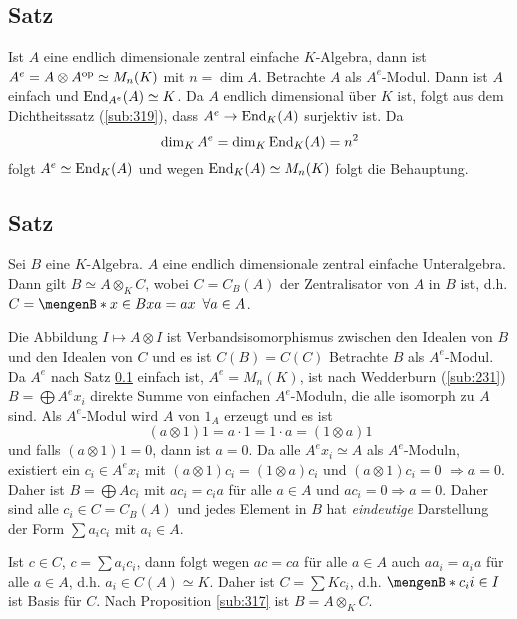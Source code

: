 \subsection[Satz: Modulisomorphie der einhüllenden Algebra zum Matrizenmodul]{Satz} %
\label{sub:321}
Ist $A$ eine endlich dimensionale zentral einfache $K$-Algebra, dann ist $A^e = A \otimes A^{\mathrm{op}} \simeq M_n(K)$ mit $n= \dim A$.
Betrachte $A$ als $A^e$-Modul. Dann ist $A$ einfach und $\operatorname{End}_{A^e} (A) \simeq K$. Da $A$ endlich dimensional über $K$ ist, folgt aus dem Dichtheitssatz (\ref{sub:319}),
dass $A^e \to \operatorname{End}_K(A)$ surjektiv ist. Da 
\[
	\dim_K A^e = \dim_K \operatorname{End}_K(A) = n^2
\]
folgt $A^e \simeq \operatorname{End}_K(A)$ und wegen $\operatorname{End}_K(A) \simeq M_n(K)$ folgt die Behauptung. \bewende

\subsection{Satz} %
\label{sub:322}
Sei $B$ eine $K$-Algebra. $A$ eine endlich dimensionale zentral einfache Unteralgebra. Dann gilt $B \simeq A \otimes_K C$, wobei $C= C_B(A)$ der Zentralisator von $A$ in 
$B$ ist, d.h. $C= \set[x \in B]{x a = a x \enspace \forall a \in A}$. 

Die Abbildung $I \mapsto A \otimes I$ ist Verbandsisomorphismus zwischen den Idealen von $B$ und 
den Idealen von $C$ und es ist $C(B)= C(C)$
Betrachte $B$ als $A^e$-Modul. Da $A^e$ nach Satz \ref{sub:321} einfach ist, $A^e = M_n(K)$, ist nach Wedderburn (\ref{sub:231}) 
\(
	B = \bigoplus A^e x_i
\)
direkte Summe von einfachen $A^e$-Moduln, die alle isomorph zu $A$ sind. Als $A^e$-Modul wird $A$ von $1_A$ erzeugt und es ist 
\[
	(a \otimes 1)1 = a \cdot 1 = 1 \cdot a = (1 \otimes a) 1
\]
und falls $(a \otimes 1)1 = 0$, dann ist $a=0$. Da alle $A^e x_i \simeq A$ als $A^e$-Moduln, existiert ein $c_i \in A^e x_i$ mit $(a \otimes 1)c_i = (1 \otimes a)c_i$
und $(a \otimes 1)c_i =0$ $\Rightarrow a=0$. Daher ist $B= \bigoplus Ac_i$ mit $a c_i = c_i a$ für alle $a \in A$ und $a c_i = 0 \Rightarrow a=0$. Daher sind alle 
$c_i \in C= C_B(A)$ und jedes Element in $B$ hat \emph{eindeutige} Darstellung der Form $\sum a_i c_i$ mit $a_i \in A$.

Ist $c \in C$, $c = \sum a_i c_i$, dann folgt wegen $a c = c a$ für alle $a \in A$ auch $a a_i = a_i a$ für alle $a \in A$, d.h. $a_i \in C(A) \simeq K$. Daher ist
$C = \sum K c_i$, d.h. $\set[c_i]{i \in I}$ ist Basis für $C$. Nach Proposition \ref{sub:317} ist $B = A \otimes_K C$. 

